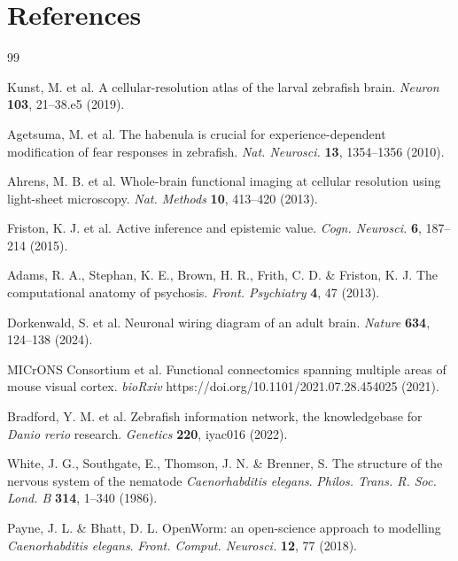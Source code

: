 \documentclass[12pt,a4paper]{article}
\begin{document}
\clearpage
\section*{References}

\begin{thebibliography}{99}
\setlength{\itemsep}{2pt}

Kunst, M. et al.
A cellular-resolution atlas of the larval zebrafish brain.
\textit{Neuron} \textbf{103}, 21--38.e5 (2019).

Agetsuma, M. et al.
The habenula is crucial for experience-dependent modification of fear
responses in zebrafish.
\textit{Nat. Neurosci.} \textbf{13}, 1354--1356 (2010).

Ahrens, M. B. et al.
Whole-brain functional imaging at cellular resolution using light-sheet
microscopy.
\textit{Nat. Methods} \textbf{10}, 413--420 (2013).

Friston, K. J. et al.
Active inference and epistemic value.
\textit{Cogn. Neurosci.} \textbf{6}, 187--214 (2015).

Adams, R. A., Stephan, K. E., Brown, H. R., Frith, C. D. \&
Friston, K. J.
The computational anatomy of psychosis.
\textit{Front. Psychiatry} \textbf{4}, 47 (2013).

Dorkenwald, S. et al.
Neuronal wiring diagram of an adult brain.
\textit{Nature} \textbf{634}, 124--138 (2024).

MICrONS Consortium et al.
Functional connectomics spanning multiple areas of mouse visual cortex.
\textit{bioRxiv} https://doi.org/10.1101/2021.07.28.454025 (2021).

Bradford, Y. M. et al.
Zebrafish information network, the knowledgebase for \textit{Danio rerio}
research.
\textit{Genetics} \textbf{220}, iyac016 (2022).

White, J. G., Southgate, E., Thomson, J. N. \& Brenner, S.
The structure of the nervous system of the nematode
\textit{Caenorhabditis elegans}.
\textit{Philos. Trans. R. Soc. Lond. B} \textbf{314}, 1--340 (1986).

Payne, J. L. \& Bhatt, D. L.
OpenWorm: an open-science approach to modelling \textit{Caenorhabditis elegans}.
\textit{Front. Comput. Neurosci.} \textbf{12}, 77 (2018).


\end{thebibliography}
\end{document}
